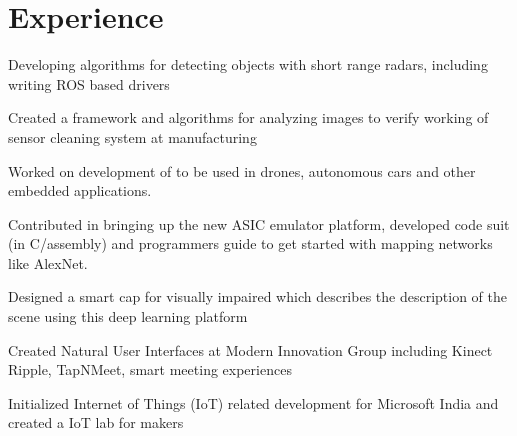\documentclass[]{resume-openfont}
\begin{document}
\begin{minipage}[t]{0.63\textwidth} 


\section{Experience}

\vspace{\topsep} %
\begin{tightemize}
\item Developing algorithms for detecting objects with short range radars, including writing ROS based drivers 
\item Created a framework and algorithms for analyzing images to verify working of sensor cleaning system at manufacturing 
\end{tightemize}
\sectionsep

\begin{tightemize}
\item  Worked on development of  \href{https://developer.qualcomm.com/software/snapdragon-neural-processing-engine}{} to be used in drones, autonomous cars and other embedded applications.
\item Contributed in bringing up the new ASIC emulator platform, developed code suit (in C/assembly) and programmers guide to get started with mapping networks like AlexNet.
\item Designed a smart cap for visually impaired which describes the description of the scene using this deep learning platform
\end{tightemize}
\sectionsep

\begin{tightemize}
\item Created Natural User Interfaces 
at Modern Innovation Group including Kinect Ripple, TapNMeet, smart meeting experiences
\item Initialized Internet of Things (IoT) related development for Microsoft India and created a IoT lab for makers
\end{tightemize}
\sectionsep


\end{minipage}
\end{document}
